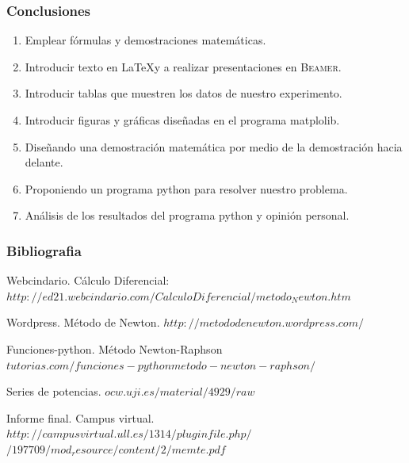 \documentclass{beamer}
\begin{document}
\begin{frame}
\frametitle{Conclusiones}
\begin{enumerate}
\item Emplear fórmulas y demostraciones matemáticas. \pause 
\item Introducir texto en \LaTeX y a realizar presentaciones en \textsc{Beamer}.\pause 
\item Introducir tablas que muestren los datos de nuestro experimento. \pause
\item Introducir figuras y gráficas diseñadas en el programa matplolib. \pause
\item Diseñando una demostración matemática por medio de la demostración hacia delante. \pause
\item Proponiendo un programa python para resolver nuestro problema. \pause
\item Análisis de los resultados del programa python y opinión personal. 
\end{enumerate} 
\end{frame}

\begin{frame}
\frametitle{Bibliografia}
\begin{thebibliography}{10}
\beamertemplatebookbibitems
{}
Webcindario. Cálculo Diferencial:
{\small $ http://ed21.webcindario.com/CalculoDiferencial/metodo_Newton.htm $}

Wordpress. Método de Newton.
{\small $ http://metododenewton.wordpress.com/$ }

Funciones-python. Método Newton-Raphson
{\small $ tutorias.com/funciones-pythonmetodo-newton-raphson/ $ }

Series de potencias.
{\small $ ocw.uji.es/material/4929/raw$ }

Informe final. Campus virtual.\\
{\small $ http://campusvirtual.ull.es/1314/pluginfile.php/$}
{\small $/197709/mod_resource/content/2/memte.pdf $ }
\end{thebibliography}
\end{frame}
\end{document}
